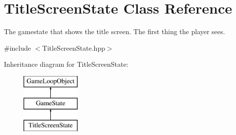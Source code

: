 \hypertarget{class_title_screen_state}{}\section{Title\+Screen\+State Class Reference}
\label{class_title_screen_state}


The gamestate that shows the title screen. The first thing the player sees.  




{\ttfamily \#include $<$Title\+Screen\+State.\+hpp$>$}

Inheritance diagram for Title\+Screen\+State\+:\begin{figure}[H]
\begin{center}
\leavevmode
\includegraphics[height=3.000000cm]{class_title_screen_state}
\end{center}
\end{figure}
